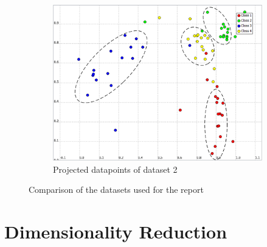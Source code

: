 \documentclass[a4paper,10pt]{article}
\begin{document}
\begin{figure}[H]
	\begin{subfigure}[t]{0.33\textwidth}
      \centering
      \includegraphics[width=\textwidth]{pictures/dataset_new_2}
      \caption{Projected datapoints of dataset 2}
      \label{fig:dataset_new_2}
    \end{subfigure}%
  \caption{Comparison of the datasets used for the report}
\end{figure}


\section{Dimensionality Reduction}
\end{document}
